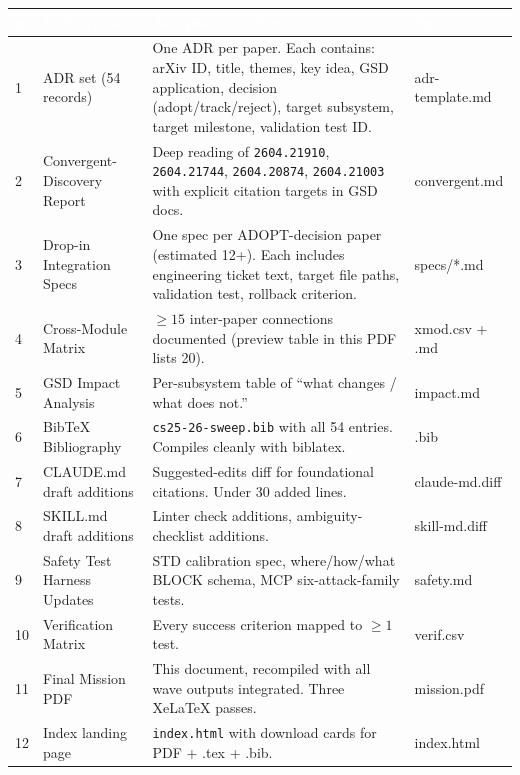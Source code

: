 \documentclass[11pt,letterpaper]{article}
\newcommand{\arxivid}[1]{\texttt{\textcolor{accent}{#1}}}
\newcommand{\tableheader}[1]{\textbf{\sffamily\textcolor{white}{#1}}}
\begin{document}
\begin{center}
\begin{tabularx}{\textwidth}{C{0.8cm}L{4.2cm}XL{2.5cm}}
\toprule
{}
\tableheader{\#} & \tableheader{Deliverable} & \tableheader{Acceptance Criteria} & \tableheader{Spec} \\
 & ADR set (54 records) & One ADR per paper. Each contains: arXiv ID, title, themes, key idea, GSD application, decision (adopt/track/reject), target subsystem, target milestone, validation test ID. & adr-template.md \\
2 & Convergent-Discovery Report & Deep reading of \arxivid{2604.21910}, \arxivid{2604.21744}, \arxivid{2604.20874}, \arxivid{2604.21003} with explicit citation targets in GSD docs. & convergent.md \\
3 & Drop-in Integration Specs & One spec per ADOPT-decision paper (estimated 12+). Each includes engineering ticket text, target file paths, validation test, rollback criterion. & specs/*.md \\
4 & Cross-Module Matrix & ${\geq}15$ inter-paper connections documented (preview table in this PDF lists 20). & xmod.csv + .md \\
5 & GSD Impact Analysis & Per-subsystem table of ``what changes / what does not.'' & impact.md \\
6 & BibTeX Bibliography & \texttt{cs25-26-sweep.bib} with all 54 entries. Compiles cleanly with biblatex. & .bib \\
7 & CLAUDE.md draft additions & Suggested-edits diff for foundational citations. Under 30 added lines. & claude-md.diff \\
8 & SKILL.md draft additions & Linter check additions, ambiguity-checklist additions. & skill-md.diff \\
9 & Safety Test Harness Updates & STD calibration spec, where/how/what BLOCK schema, MCP six-attack-family tests. & safety.md \\
10 & Verification Matrix & Every success criterion mapped to ${\geq}1$ test. & verif.csv \\
11 & Final Mission PDF & This document, recompiled with all wave outputs integrated. Three XeLaTeX passes. & mission.pdf \\
12 & Index landing page & \texttt{index.html} with download cards for PDF + .tex + .bib. & index.html \\
\bottomrule
\end{tabularx}
\end{center}
\end{document}
